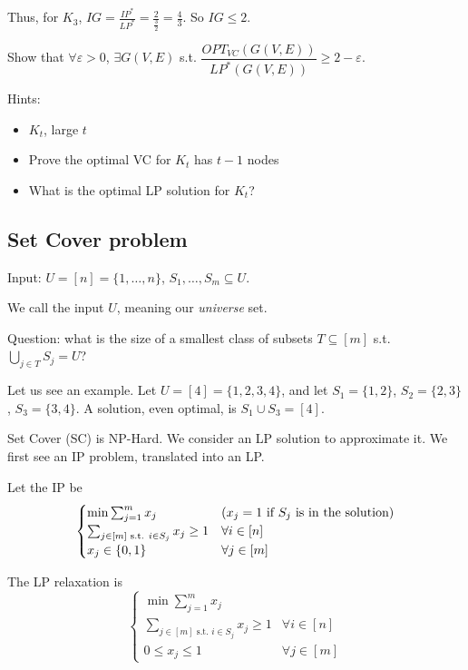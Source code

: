     Thus, for $K_3$, $IG = \frac{IP^*}{LP^*} = \frac{2}{\frac{3}{2}} = \frac{4}{3}$. So $IG \leq 2$.

    \begin{exercise}
        Show that $\forall \varepsilon > 0$, $\exists G(V,E)$ s.t. $\dfrac{OPT_{VC}(G(V,E))}{LP^*(G(V,E))} \geq 2 - \varepsilon$.

        Hints:
        \begin{itemize}
            \item $K_t$, large $t$
            \item Prove the optimal VC for $K_t$ has $t-1$ nodes
            \item What is the optimal LP solution for $K_t$?
        \end{itemize}
    \end{exercise}


\subsection{Set Cover problem}

    Input: $U = [n] = \{ 1, \dots, n \}$, $S_1, \dots, S_m \subseteq U$.

    We call the input $U$, meaning our \textit{universe} set.

    Question: what is the size of a smallest class of subsets $T \subseteq [m]$ s.t. $\bigcup_{j \in T} S_j = U$?

    Let us see an example. Let $U = [4] = \{ 1,2,3,4 \}$, and let $S_1 = \{ 1,2 \}$, $S_2 = \{ 2,3 \}$, $S_3 = \{ 3,4 \}$.
    A solution, even optimal, is $S_1 \cup S_3 = [4]$.

    Set Cover (SC) is NP-Hard. We consider an LP solution to approximate it. We first see an IP problem, translated into an LP.

    Let the IP be
    \begin{equation}
        \begin{cases}
            \min \sum_{j=1}^m x_j                               & (x_j = 1 \text{ if } S_j \text{ is in the solution})\\
            \sum_{j \in [m] \text{ s.t. } i \in S_j} x_j \geq 1 & \forall i \in [n]\\
            x_j \in \{ 0,1 \}                                          & \forall j \in [m]
        \end{cases}
    \end{equation}

    The LP relaxation is
    \begin{equation}
        \begin{cases}
            \min \sum_{j=1}^m x_j                               \\
            \sum_{j \in [m] \text{ s.t. } i \in S_j} x_j \geq 1 & \forall i \in [n]\\
            0 \leq x_j \leq 1                                   & \forall j \in [m]
        \end{cases}
    \end{equation}

